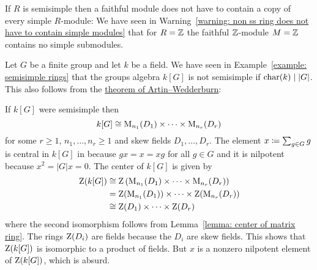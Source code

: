 \begin{warning}
  If $R$ is semisimple then a faithful module does not have to contain a copy of every simple $R$-module:
  We have seen in Warning~\ref{warning: non ss ring does not have to contain simple modules} that for $R = \mathbb{Z}$ the faithful $\mathbb{Z}$-module $M = \mathbb{Z}$ contains no simple submodules.
\end{warning}


\begin{remark}
  Let $G$ be a finite group and let $k$ be a field.
  We have seen in Example~\ref{example: semisimple rings} that the groups algebra $k[G]$ is not semisimple if $\operatorname{char}(k) \mid |G|$.
  This also follows from the \hyperref[theorem: artin wedderburn theorem]{theorem of Artin--Wedderburn}:
  
  If $k[G]$ were semisimple then
  \[
          k[G]
    \cong \operatorname{M}_{n_1}(D_1) \times \dotsb \times \operatorname{M}_{n_r}(D_r)
  \]
  for some $r \geq 1$, $n_1, \dotsc, n_r \geq 1$ and skew fields $D_1, \dotsc, D_r$.
  The element $x \coloneqq \sum_{g \in G} g$ is central in $k[G]$ in because $g x = x = x g$ for all $g \in G$ and it is nilpotent because $x^2 = |G| x = 0$.
  The center of $k[G]$ is given by
  \begin{align*}
            \operatorname{Z}(k[G])
    &\cong  \operatorname{Z}\left( \operatorname{M}_{n_1}(D_1) \times \dotsb \times \operatorname{M}_{n_r}(D_r) \right)  \\
    &=      \operatorname{Z}(\operatorname{M}_{n_1}(D_1)) \times \dotsb \times \operatorname{Z}(\operatorname{M}_{n_r}(D_r))  \\
    &\cong  \operatorname{Z}(D_1) \times \dotsb \times \operatorname{Z}(D_r)
  \end{align*}
  where the second isomorphism follows from Lemma~\ref{lemma: center of matrix ring}.
  The rings $\operatorname{Z}(D_i)$ are fields because the $D_i$ are skew fields.
  This shows that $\operatorname{Z}(k[G])$ is isomorphic to a product of fields.
  But $x$ is a nonzero nilpotent element of $\operatorname{Z}(k[G])$, which is absurd.
\end{remark}




